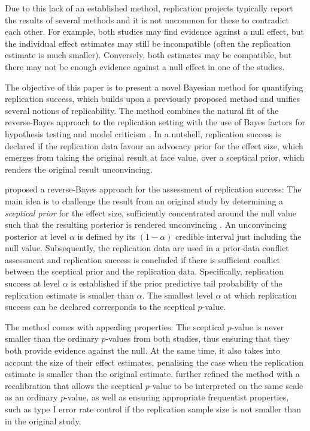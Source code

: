 Due to this lack of an established method, replication projects typically report
the results of several methods and it is not uncommon for these to contradict
each other. For example, both studies may find evidence against a null effect,
but the individual effect estimates may still be incompatible (often the
replication estimate is much smaller). Conversely, both estimates may be
compatible, but there may not be enough evidence against a null effect in one of
the studies.

The objective of this paper is to present a novel Bayesian method for
quantifying replication success, which builds upon a previously proposed method
\citep[the \emph{sceptical $p$-value} from][]{Held2020} and unifies several
notions of replicability. The method combines the natural fit of the
reverse-Bayes approach to the replication setting with the use of Bayes factors
for hypothesis testing \citep{Jeffreys1961, Kass1995} and model criticism
\citep{Box1980}. In a nutshell, replication success is declared if the
replication data favour an advocacy prior for the effect size, which emerges
from taking the original result at face value, over a sceptical prior, which
renders the original result unconvincing.


\citet{Held2020} proposed a reverse-Bayes approach for the assessment of
replication success: The main idea is to challenge the result from an original
study by determining a \emph{sceptical prior} for the effect size, sufficiently
concentrated around the null value such that the resulting posterior is rendered
unconvincing \citep{Matthews2001b}. An unconvincing posterior at level $\alpha$
is defined by its $(1 - \alpha)$ credible interval just including the null
value. Subsequently, the replication data are used in a prior-data conflict
assessment \citep{Box1980, Evans2006} and replication success is concluded if
there is sufficient conflict between the sceptical prior and the replication
data. Specifically, replication success at level $\alpha$ is established if the
prior predictive tail probability of the replication estimate is smaller than
$\alpha$. The smallest level $\alpha$ at which replication success can be
declared corresponds to the sceptical $p$-value.

The method comes with appealing properties: The sceptical $p$-value is never
smaller than the ordinary $p$-values from both studies, thus ensuring that they
both provide evidence against the null. At the same time, it also takes into
account the size of their effect estimates, penalising the case when the
replication estimate is smaller than the original estimate. \citet{Held2021}
further refined the method with a recalibration that allows the sceptical
$p$-value to be interpreted on the same scale as an ordinary $p$-value, as well
as ensuring appropriate frequentist properties, such as type I error rate
control if the replication sample size is not smaller than in the original
study.

